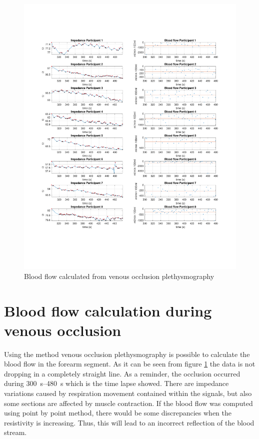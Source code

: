 \begin{figure}
	\includegraphics[width=\textwidth,height=\textheight,keepaspectratio,trim={0.5cm 0.5cm 2cm 2cm},clip]{figure4}    
	\caption{Blood flow calculated from venous occlusion plethysmography}
	\label{fig:blood_flow:venous_occlusion}
\end{figure}

\section{Blood flow calculation during venous occlusion}
\label{section5.2}
Using the method venous occlusion plethysmography is possible to calculate the blood flow in the forearm segment. As it can be seen from figure \ref{fig:blood_flow:venous_occlusion} the data is not dropping in a completely straight line. As a reminder, the occlusion occurred during \SIrange{300}{480}{\second} which is the time lapse showed. There are impedance variations caused by respiration movement contained within the signals, but also some sections are affected by muscle contraction. If the blood flow was computed using point by point method, there would be some discrepancies when the resistivity is increasing. Thus, this will lead to an incorrect reflection of the blood stream. 

